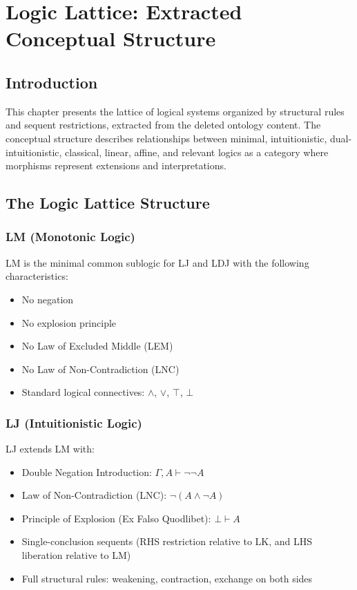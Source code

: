 
\chapter*{Logic Lattice: Extracted Conceptual Structure}

\section*{Introduction}

This chapter presents the lattice of logical systems organized by structural rules and sequent restrictions, extracted from the deleted ontology content. The conceptual structure describes relationships between minimal, intuitionistic, dual-intuitionistic, classical, linear, affine, and relevant logics as a category where morphisms represent extensions and interpretations.

\section*{The Logic Lattice Structure}

\subsection*{LM (Monotonic Logic)}

LM is the minimal common sublogic for LJ and LDJ with the following characteristics:
\begin{itemize}
    \item No negation
    \item No explosion principle
    \item No Law of Excluded Middle (LEM)
    \item No Law of Non-Contradiction (LNC)
    \item Standard logical connectives: $\wedge$, $\vee$, $\top$, $\bot$
\end{itemize}

\subsection*{LJ (Intuitionistic Logic)}

LJ extends LM with:
\begin{itemize}
    \item Double Negation Introduction: $\Gamma, A \vdash \neg \neg A$
    \item Law of Non-Contradiction (LNC): $\neg(A \wedge \neg A)$
    \item Principle of Explosion (Ex Falso Quodlibet): $\bot \vdash A$
    \item Single-conclusion sequents (RHS restriction relative to LK, and LHS liberation relative to LM)
    \item Full structural rules: weakening, contraction, exchange on both sides
\end{itemize}

